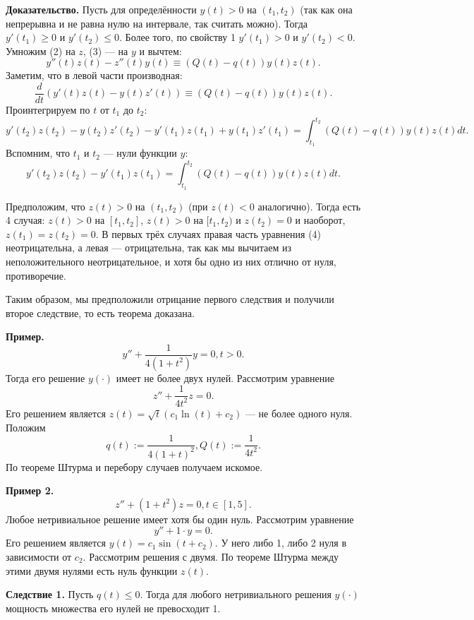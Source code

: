 \textbf{Доказательство.} Пусть для определённости $y(t) > 0$ на $(t_1, t_2)$ (так как она непрерывна и не равна нулю на интервале, так считать можно).
Тогда $y'(t_1) \ge 0$ и $y'(t_2) \le 0$.
Более того, по свойству 1 $y'(t_1) > 0$ и $y'(t_2) < 0$.
Умножим (2) на $z$, (3) --- на $y$ и вычтем:
\[
    y''(t) z(t) - z''(t) y(t) \equiv (Q(t) - q(t)) y(t) z(t).
\]
Заметим, что в левой части производная:
\[
    \frac{d}{dt} \left( y'(t) z(t) - y(t) z'(t) \right) \equiv (Q(t) - q(t)) y(t) z(t).
\]
Проинтегрируем по $t$ от $t_1$ до $t_2$:
\[
    y'(t_2) z(t_2) - y(t_2) z'(t_2) - y'(t_1) z(t_1) + y(t_1) z'(t_1) = \int_{t_1}^{t_2} (Q(t) - q(t)) y(t) z(t) dt.
\]
Вспомним, что $t_1$ и $t_2$ --- нули функции $y$:
\begin{equation}
    y'(t_2) z(t_2) - y'(t_1) z(t_1) = \int_{t_1}^{t_2} (Q(t) - q(t)) y(t) z(t) dt.
\end{equation}

Предположим, что $z(t) > 0$ на $(t_1, t_2)$ (при $z(t) < 0$ аналогично).
Тогда есть 4 случая: $z(t) > 0$ на $[t_1, t_2]$, $z(t) > 0$ на $[t_1, t_2)$ и $z(t_2) = 0$ и наоборот, $z(t_1) = z(t_2) = 0$.
В первых трёх случаях правая часть уравнения (4) неотрицательна, а левая --- отрицательна, так как мы вычитаем из неположительного неотрицательное, и хотя бы одно из них отлично от нуля, противоречие.

Таким образом, мы предположили отрицание первого следствия и получили второе следствие, то есть теорема доказана.

\QED

\textbf{Пример.}
\[
    y'' + \frac{1}{4(1 + t^2)}y = 0, t > 0.
\]
Тогда его решение $y(\cdot)$ имеет не более двух нулей.
Рассмотрим уравнение
\[
    z'' + \frac{1}{4t^2} z = 0.
\]
Его решением является $z(t) = \sqrt t (c_1 \ln(t) + c_2)$ --- не более одного нуля. Положим
\[
    q(t) := \frac{1}{4(1 + t)^2}, Q(t) := \frac{1}{4t^2}.
\]
По теореме Штурма и перебору случаев получаем искомое.

\textbf{Пример 2.}
\[
    z'' + (1 + t^2) z = 0, t \in [1, 5].
\]
Любое нетривиальное решение имеет хотя бы один нуль.
Рассмотрим уравнение
\[
    y'' + 1 \cdot y = 0.
\]
Его решением является $y(t) = c_1 \sin(t + c_2)$.
У него либо 1, либо 2 нуля в зависимости от $c_2$. Рассмотрим решения с двумя.
По теореме Штурма между этими двумя нулями есть нуль функции $z(t)$.

\textbf{Следствие 1.} Пусть $q(t) \le 0$. Тогда для любого нетривиального решения $y(\cdot)$ мощность множества его нулей не превосходит 1.

